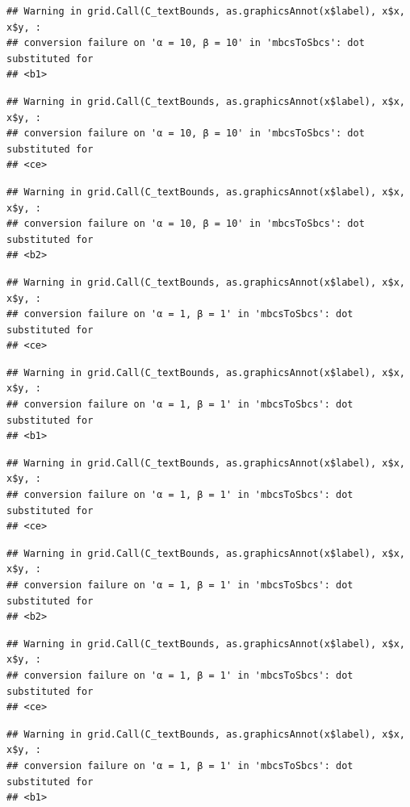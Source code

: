 \documentclass[]{book}
\theoremstyle{definition}
\theoremstyle{definition}
\theoremstyle{definition}
\theoremstyle{remark}
\begin{document}
\begin{verbatim}
## Warning in grid.Call(C_textBounds, as.graphicsAnnot(x$label), x$x, x$y, :
## conversion failure on 'α = 10, β = 10' in 'mbcsToSbcs': dot substituted for
## <b1>
\end{verbatim}

\begin{verbatim}
## Warning in grid.Call(C_textBounds, as.graphicsAnnot(x$label), x$x, x$y, :
## conversion failure on 'α = 10, β = 10' in 'mbcsToSbcs': dot substituted for
## <ce>
\end{verbatim}

\begin{verbatim}
## Warning in grid.Call(C_textBounds, as.graphicsAnnot(x$label), x$x, x$y, :
## conversion failure on 'α = 10, β = 10' in 'mbcsToSbcs': dot substituted for
## <b2>
\end{verbatim}

\begin{verbatim}
## Warning in grid.Call(C_textBounds, as.graphicsAnnot(x$label), x$x, x$y, :
## conversion failure on 'α = 1, β = 1' in 'mbcsToSbcs': dot substituted for
## <ce>
\end{verbatim}

\begin{verbatim}
## Warning in grid.Call(C_textBounds, as.graphicsAnnot(x$label), x$x, x$y, :
## conversion failure on 'α = 1, β = 1' in 'mbcsToSbcs': dot substituted for
## <b1>
\end{verbatim}

\begin{verbatim}
## Warning in grid.Call(C_textBounds, as.graphicsAnnot(x$label), x$x, x$y, :
## conversion failure on 'α = 1, β = 1' in 'mbcsToSbcs': dot substituted for
## <ce>
\end{verbatim}

\begin{verbatim}
## Warning in grid.Call(C_textBounds, as.graphicsAnnot(x$label), x$x, x$y, :
## conversion failure on 'α = 1, β = 1' in 'mbcsToSbcs': dot substituted for
## <b2>
\end{verbatim}

\begin{verbatim}
## Warning in grid.Call(C_textBounds, as.graphicsAnnot(x$label), x$x, x$y, :
## conversion failure on 'α = 1, β = 1' in 'mbcsToSbcs': dot substituted for
## <ce>
\end{verbatim}

\begin{verbatim}
## Warning in grid.Call(C_textBounds, as.graphicsAnnot(x$label), x$x, x$y, :
## conversion failure on 'α = 1, β = 1' in 'mbcsToSbcs': dot substituted for
## <b1>
\end{verbatim}
\end{document}
